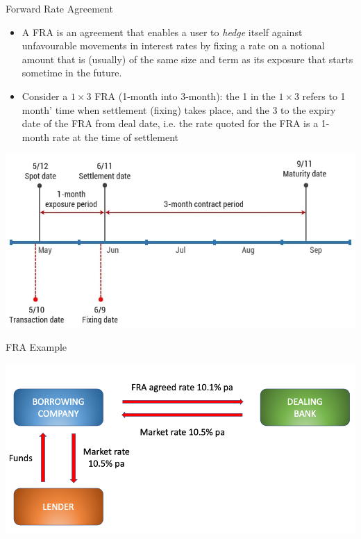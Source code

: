 \documentclass{beamer}
\begin{document}
\begin{frame}{Forward Rate Agreement}
	\begin{itemize}
	\item<1-> A FRA is an agreement that enables a user to \emph{hedge} itself against unfavourable movements in interest rates by fixing a rate on a notional amount that is (usually) of the same size and term as its exposure that starts sometime in the future. 
	\item<2-> Consider a $1\times 3$ FRA (1-month into 3-month): the 1 in the $1\times 3$ refers to 1 month' time when settlement (fixing) takes place, and the 3 to the expiry date of the FRA from deal date, i.e. the rate quoted for the FRA is a 1-month rate at the time of settlement
	\end{itemize}
	\begin{center}
		\includegraphics[width=0.5\linewidth]{fra_timeline}
	\end{center}
\end{frame}

\begin{frame}{FRA Example}
	\begin{center}
		\includegraphics[width=0.9\linewidth]{FRA_diagram}
	\end{center}
\end{frame}
\end{document}
